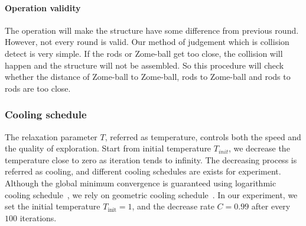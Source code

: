 \paragraph{Operation validity}
The operation will make the structure have some difference from previous round. However, not every round is valid. Our method of judgement which is collision detect is very simple. If the rods or Zome-ball get too close, the collision will happen and the structure will not be assembled. So this procedure will check whether the distance of Zome-ball to Zome-ball, rods to Zome-ball and rods to rods are too close.

\subsubsection{Cooling schedule}
The relaxation parameter $T$, referred as temperature, controls both the speed and the quality of exploration.
Start from initial temperature $T_{init}$, we decrease the temperature close to zero as iteration tends to infinity.
The decreasing process is referred as cooling, and different cooling schedules are exists for experiment.
Although the global minimum convergence is guaranteed using logarithmic cooling schedule~\cite{Salamon:2002:SA}, we rely on geometric cooling schedule~\cite{Henderson:2003:SA}. 
In our experiment, we set the initial temperature $T_\text{init} = 1$, and the decrease rate $C=0.99$ after every $100$ iterations.